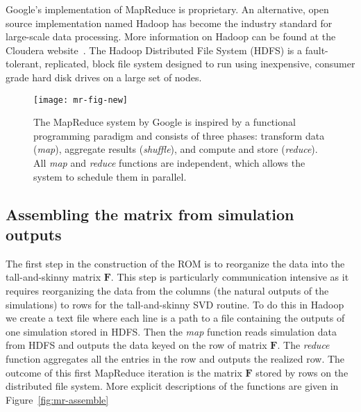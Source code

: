 \documentclass[final]{siamltex}
\providecommand{\mat}[1]{\boldsymbol{#1}}
\providecommand{\mF}{\ensuremath{\mat{F}}}
\begin{document}
Google's implementation of MapReduce is proprietary. An alternative,
open source implementation named Hadoop has become the industry
standard for large-scale data processing. More information on Hadoop
can be found at the Cloudera website~\cite{Hadoop2010}. The Hadoop
Distributed File System (HDFS) is a fault-tolerant, replicated, block
file system designed to run using inexpensive, consumer grade hard
disk drives on a large set of nodes.

\begin{figure}[t]
\texttt{[image: mr-fig-new]}
\caption{The MapReduce system by Google is inspired by a functional
  programming paradigm and consists of three phases: transform data
  ({\textit{map}\xspace}), aggregate results ({\textit{shuffle}\xspace}), and compute and store
  ({\textit{reduce}\xspace}). All {\textit{map}\xspace} and {\textit{reduce}\xspace} functions are independent, which
  allows the system to schedule them in parallel. }
\label{fig:mapreduce}
\end{figure}  

\subsection{Assembling the matrix from simulation outputs}

The first step in the construction of the ROM is to reorganize the
data into the tall-and-skinny matrix $\mF$.  This step is particularly
communication intensive as it requires reorganizing the data from the
columns (the natural outputs of the simulations) to rows for the
tall-and-skinny SVD routine. To do this in Hadoop we create a text
file where each line is a path to a file containing the outputs of one
simulation stored in HDFS. Then the {\textit{map}\xspace} function reads simulation
data from HDFS and outputs the data keyed on the row of matrix
$\mF$. The {\textit{reduce}\xspace} function aggregates all the entries in the row and
outputs the realized row.  The outcome of this first MapReduce
iteration is the matrix $\mF$ stored by rows on the distributed file
system.  More explicit descriptions of the functions are given in
Figure~\ref{fig:mr-assemble}
\end{document}
